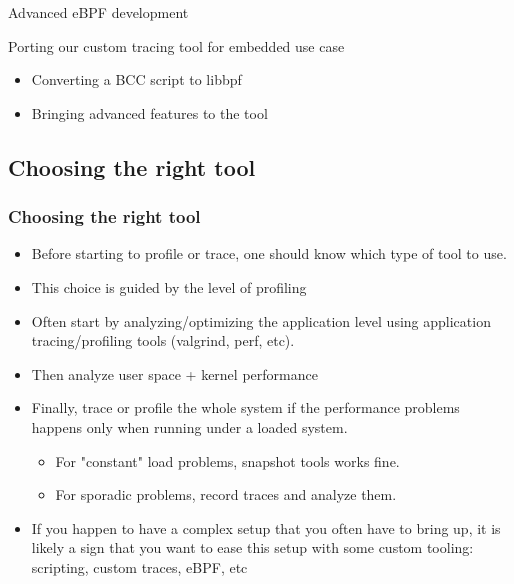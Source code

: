 \setuplabframe
{Advanced eBPF development}
{
  Porting our custom tracing tool for embedded use case
  \begin{itemize}
    \item Converting a BCC script to libbpf
    \item Bringing advanced features to the tool
  \end{itemize}
}

\subsection{Choosing the right tool}

\begin{frame}[fragile]
  \frametitle{Choosing the right tool}
  \begin{itemize}
    \item Before starting to profile or trace, one should know which type of
          tool to use.
    \item This choice is guided by the level of profiling
    \item Often start by analyzing/optimizing the application level using
          application tracing/profiling tools (valgrind, perf, etc).
    \item Then analyze user space + kernel performance
    \item Finally, trace or profile the whole system if the performance problems
          happens only when running under a loaded system.
    \begin{itemize}
      \item For "constant" load problems, snapshot tools works fine.
      \item For sporadic problems, record traces and analyze them.
    \end{itemize}
  \item If you happen to have a complex setup that you often have to bring up,
  it is likely a sign that you want to ease this setup with some custom tooling:
  scripting, custom traces, eBPF, etc
  \end{itemize}
\end{frame}
